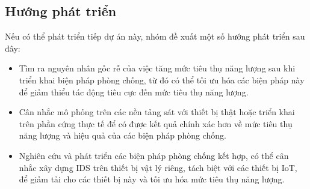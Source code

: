 \subsection{Hướng phát triển}
Nếu có thể phát triển tiếp dự án này, nhóm đề xuất một số hướng phát triển sau đây:
\begin{itemize}
    \item Tìm ra nguyên nhân gốc rễ của việc tăng mức tiêu thụ năng lượng sau khi triển khai biện pháp phòng chống, từ đó có thể tối ưu hóa các biện pháp này để giảm thiểu tác động tiêu cực đến mức tiêu thụ năng lượng.
    \item Cân nhắc mô phỏng trên các nền tảng sát với thiết bị thật hoặc triển khai trên phần cứng thực tế để có được kết quả chính xác hơn về mức tiêu thụ năng lượng và hiệu quả của các biện pháp phòng chống.
    \item Nghiên cứu và phát triển các biện pháp phòng chống kết hợp, có thể cân nhắc xây dựng IDS trên thiết bị vật lý riêng, tách biệt với các thiết bị IoT, để giảm tải cho các thiết bị này và tối ưu hóa mức tiêu thụ năng lượng.
\end{itemize}